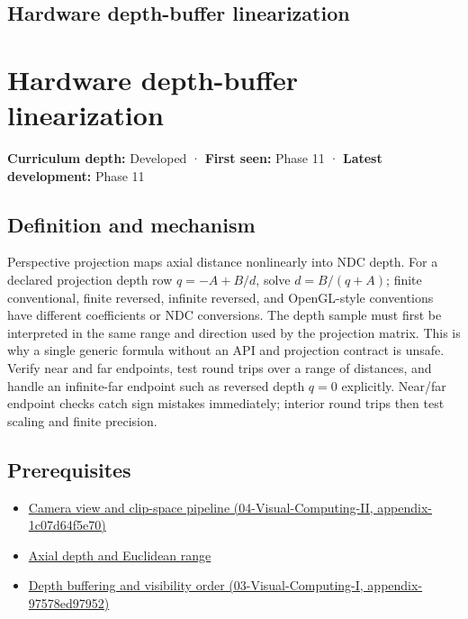 \hypertarget{appendix-1bc40b08db4a}{}
\section*{Hardware depth-buffer linearization}
\chapter{Hardware depth-buffer linearization}\label{appendix-1bc40b08db4a-hardware-depth-buffer-linearization}

\textbf{Curriculum depth:} Developed · \textbf{First seen:} Phase 11 · \textbf{Latest development:} Phase 11

\section{Definition and mechanism}\label{appendix-1bc40b08db4a-definition-and-mechanism}

Perspective projection maps axial distance nonlinearly into NDC depth. For a declared projection depth row \(q=-A+B/d\), solve \(d=B/(q+A)\); finite conventional, finite reversed, infinite reversed, and OpenGL-style conventions have different coefficients or NDC conversions. The depth sample must first be interpreted in the same range and direction used by the projection matrix. This is why a single generic formula without an API and projection contract is unsafe. Verify near and far endpoints, test round trips over a range of distances, and handle an infinite-far endpoint such as reversed depth \(q=0\) explicitly. Near/far endpoint checks catch sign mistakes immediately; interior round trips then test scaling and finite precision.

\section{Prerequisites}\label{appendix-1bc40b08db4a-prerequisites}

\begin{itemize}
\tightlist
\item
  \href{../04-Visual-Computing-II/main.pdf\#nameddest=appendix-1c07d64f5e70}{Camera view and clip-space pipeline (04-Visual-Computing-II, appendix-1c07d64f5e70)}
\item
  \hyperref[appendix-cac01ebeeb11]{Axial depth and Euclidean range}
\item
  \href{../03-Visual-Computing-I/main.pdf\#nameddest=appendix-97578ed97952}{Depth buffering and visibility order (03-Visual-Computing-I, appendix-97578ed97952)}
\end{itemize}

